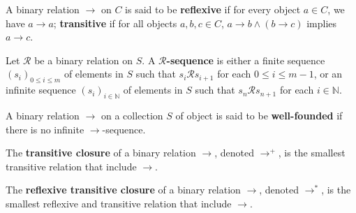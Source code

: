 \documentclass{book}
\begin{document}
  \begin{definition}
    \label{def:binary_relation:reflexivity_transitivity}
    A binary relation \( \mathop{\to} \) on \(C\) is said to be \textbf{reflexive} if for every object \(a \mathop{\in} C\), we have \(a \mathop{\to} a\); \textbf{transitive} if for all objects \( a, b, c \mathop{\in} C\), \( a \mathop{\to} b \mathop{\land} (b \mathop{\to} c) \) implies \(a \mathop{\to} c\).
  \end{definition}
  
  \begin{definition}
    \label{def:binary_relation:sequence}
    Let \(\mathcal{R}\) be a binary relation on $S$.
    A \textbf{\( \mathcal{R} \)-sequence} is either a finite sequence \( \left( s_i \right)_{0 \leq i \leq m} \) of elements in $S$ such that \(s_i \mathcal{R} s_{i+1}\) for each \( 0 \leq i \leq m-1\), or an infinite sequence \((s_i)_{i \mathop{\in} \mathbb{N}}\) of elements in $S$ such that \(s_n \mathcal{R} s_{n+1}\) for each \(i \mathop{\in} \mathbb{N}\).
\end{definition}

\begin{definition}
    \label{def:binary_relation:well_founded}
    A binary relation $\to$ on a collection $S$ of object is said to be \textbf{well-founded} if there is no infinite $\to$-sequence. 
\end{definition}

\begin{definition}
    \label{def:binary_relation:transitive_closure}
    The \textbf{transitive closure} of a binary relation $\to$, denoted $\to^+$, is the smallest transitive relation that include \( \mathop{\to} \).
  \end{definition}
  
  \begin{definition}
    \label{def:binary_relation:reflexive_transitive_closure}
    The \textbf{reflexive transitive closure} of a binary relation $\to$, denoted $\to^*$, is the smallest reflexive and transitive relation that include \( \mathop{\to} \).
  \end{definition}
\end{document}
